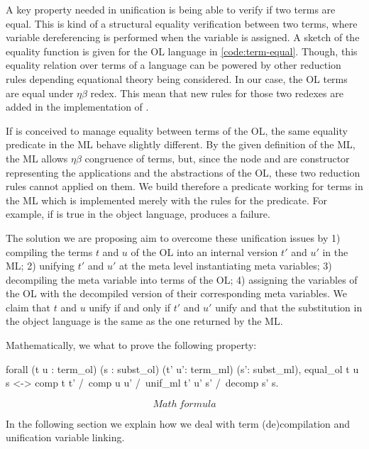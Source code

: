 \documentclass[sigconf,natbib=false]{acmart}
\begin{document}
A key property needed in unification is being able to verify if two terms are
equal. This is kind of a structural equality verification between two terms,
where variable dereferencing is performed when the variable is assigned. A
sketch of the equality function is given for the OL language in
\cref{code:term-equal}. Though, this equality relation over terms of a language
can be powered by other reduction rules depending equational theory being
considered. In our case, the OL terms are equal under $\eta\beta$ redex. This mean
that new rules for those two redexes are added in the implementation of
.

If  is conceived to manage equality between terms of the OL,
the same equality predicate in the ML behave slightly different. By the given
definition of the ML, the ML allows $\eta\beta$ congruence of terms, but, since
the node  and  are constructor representing the
applications and the abstractions of the OL, these two reduction rules cannot
applied on them. We build therefore a predicate  working for terms
in the ML which is implemented merely with the rules for the 
predicate. For example, if  is true in the object language,  produces a failure.

The solution we are proposing aim to overcome these unification issues by 1)
compiling the terms $t$ and $u$ of the OL into an internal version $t'$ and $u'$
in the ML; 2) unifying $t'$ and $u'$ at the meta level instantiating meta
variables; 3) decompiling the meta variable into terms of the OL; 4) assigning
the variables of the OL with the decompiled version of their corresponding meta
variables. We claim that $t$ and $u$ unify if and only if $t'$ and $u'$ unify
and that the substitution in the object language is the same as the one returned
by the ML.  

Mathematically, we what to prove the following property:

\begin{coqcode}
  forall (t  u : term_ol) (s : subst_ol) 
         (t' u': term_ml) (s': subst_ml), 
    equal_ol t u s <->
      comp t t' /\ comp u u' /\ 
      unif_ml t' u' s' /\ decomp s' s.
\end{coqcode}

$$Math\ formula$$

In the following section we explain how we deal with term (de)compilation and
unification variable linking.
\end{document}
